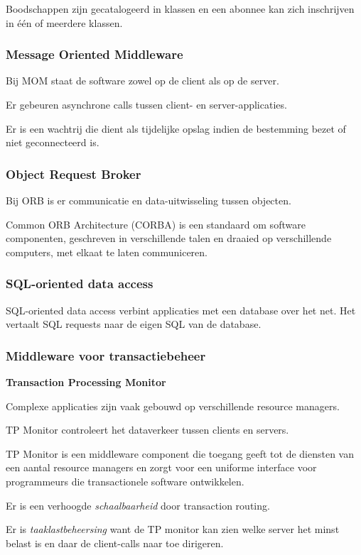 \documentclass[a4paper,12pt]{article}
\begin{document}
Boodschappen zijn gecatalogeerd in klassen en een abonnee kan zich inschrijven in één of meerdere klassen.

\subsubsection{Message Oriented Middleware}
Bij MOM staat de software zowel op de client als op de server.

Er gebeuren asynchrone calls tussen client- en server-applicaties.

Er is een wachtrij die dient als tijdelijke opslag indien de bestemming bezet of niet geconnecteerd is.

\subsubsection{Object Request Broker}
Bij ORB is er communicatie en data-uitwisseling tussen objecten.

Common ORB Architecture (CORBA) is een standaard om software componenten, geschreven in verschillende talen en draaied op verschillende computers, met elkaat te laten communiceren.

\subsubsection{SQL-oriented data access}
SQL-oriented data access verbint applicaties met een database over het net.
Het vertaalt SQL requests naar de eigen SQL van de database.

\subsubsection{Middleware voor transactiebeheer}
\textbf{Transaction Processing Monitor}

Complexe applicaties zijn vaak gebouwd op verschillende resource managers.

TP Monitor controleert het dataverkeer tussen clients en servers.

TP Monitor is een middleware component die toegang geeft tot de diensten van een aantal resource managers en zorgt voor een uniforme interface voor programmeurs die transactionele software ontwikkelen.

Er is een verhoogde \textit{schaalbaarheid} door transaction routing.

Er is \textit{taaklastbeheersing} want de TP monitor kan zien welke server het minst belast is en daar de client-calls naar toe dirigeren.
\end{document}
